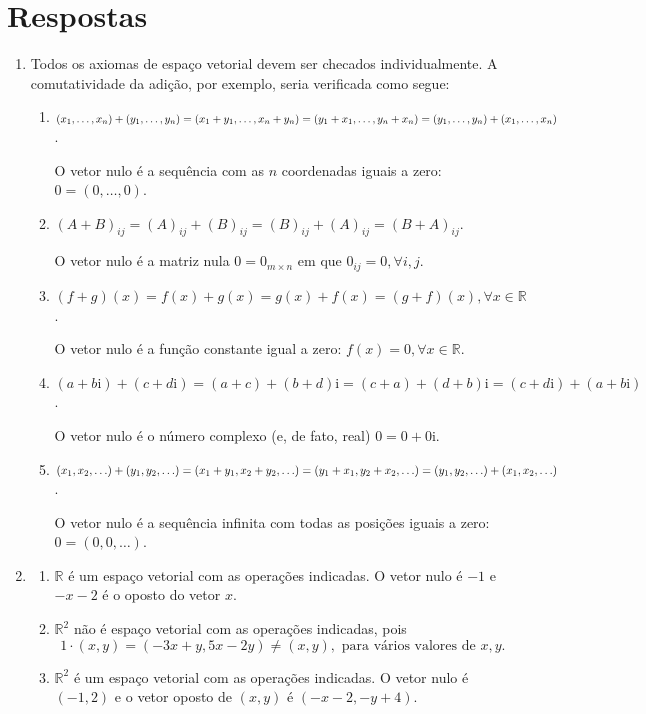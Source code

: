 \documentclass[12pt,a4paper]{article}
\newcommand\ii{\mathrm{i}}
\newcommand*\R{\mathbb{R}}
\begin{document}
\newpage
\section*{Respostas}

\begin{enumerate}
\item Todos os axiomas de espaço vetorial devem ser checados individualmente. A comutatividade da adição, por exemplo, seria verificada como segue:
\begin{enumerate}
\item
$(x_1, \ldots, x_n) + (y_1, \ldots, y_n)
= (x_1 + y_1, \ldots, x_n + y_n) \\
= (y_1 + x_1, \ldots, y_n + x_n)
= (y_1, \ldots, y_n) + (x_1, \ldots, x_n)$.

O vetor nulo é a sequência com as $n$ coordenadas iguais a zero: $0 = (0, \ldots, 0)$.

\item
$(A + B)_{ij}
= (A)_{ij} + (B)_{ij}
= (B)_{ij} + (A)_{ij}
= (B + A)_{ij}$.

O vetor nulo é a matriz nula $0 = 0_{m \times n}$ em que $0_{ij} = 0, \forall i,j$. 

\item 
$(f + g)(x)
= f(x) + g(x)
= g(x) + f(x)
= (g + f)(x), \forall x \in \R$.

O vetor nulo é a função constante igual a zero: $f(x) = 0, \forall x \in \R$.

\item 
$(a + b \ii)+ (c + d \ii)
= (a + c) + (b + d) \ii
= (c + a) + (d + b) \ii
= (c + d \ii) + (a + b \ii)$.

O vetor nulo é o número complexo (e, de fato, real) $0 = 0 + 0 \ii$.

\item 
$(x_1, x_2, \ldots) + (y_1, y_2, \ldots)
= (x_1 + y_1, x_2 + y_2, \ldots) \\
= (y_1 + x_1, y_2 + x_2, \ldots)
= (y_1, y_2, \ldots) + (x_1, x_2, \ldots)$.

O vetor nulo é a sequência infinita com todas as posições iguais a zero: $0 = (0, 0, \ldots)$.

\end{enumerate}

\item 
\begin{enumerate}
\item $\R$ é um espaço vetorial com as operações indicadas. O vetor nulo é $-1$ e $-x-2$ é o oposto do vetor $x$.
\item $\R^2$ não é espaço vetorial com as operações indicadas, pois
\[1 \cdot(x,y) = (-3x+y,5x-2y) \neq (x,y), \text{ para vários valores de }x,y.\]
\item $\R^2$ é um espaço vetorial com as operações indicadas. O vetor nulo é $(-1, 2)$ e o vetor oposto de $(x,y)$ é $(-x-2, -y+4)$.
\end{enumerate}


\end{enumerate}
\end{document}
